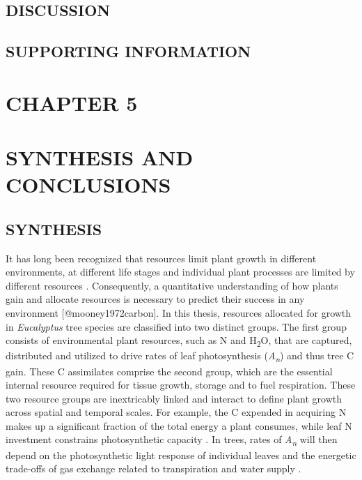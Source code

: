 \documentclass[a4paper]{article}
\begin{document}
\subsection*{DISCUSSION}
\subsection*{SUPPORTING INFORMATION}

\setcounter{page}{1}     
\clearpage
\section*{CHAPTER 5 \\ \mbox{ }\\ SYNTHESIS AND CONCLUSIONS}
\subsection*{SYNTHESIS}
It has long been recognized that resources limit plant growth in different environments, at different life stages and individual plant processes are limited by different resources \citep{bazzaz2000reproductive}. Consequently, a quantitative understanding of how plants gain and allocate resources is necessary to predict their success in any environment [@mooney1972carbon]. In this thesis, resources allocated for growth in \textit{Eucalyptus} tree species are classified into two distinct groups. The first group consists of environmental plant resources, such as N and H\textsubscript{2}O, that are captured, distributed and utilized to drive rates of leaf photosynthesis (\textit{A\textsubscript{n}}) and thus tree C gain. These C assimilates comprise the second group, which are the essential internal resource required for tissue growth, storage and to fuel respiration. These two resource groups are inextricably linked and interact to define plant growth across spatial and temporal scales. For example, the C expended in acquiring N makes up a significant fraction of the total energy a plant consumes, while leaf N investment constrains photosynthetic capacity \citep{chapin1987plant}. In trees, rates of \textit{A\textsubscript{n}} will then depend on the photosynthetic light response of individual leaves and the energetic trade-offs of gas exchange related to transpiration and water supply \citep{givnish1988adaptation}.
\end{document}
